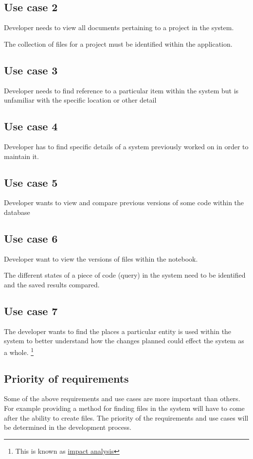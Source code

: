 \subsection{Use case 2}\label{use-case-2}

Developer needs to view all documents pertaining to a project in the
system.

The collection of files for a project must be identified within the application.

\subsection{Use case 3}\label{use-case-3}

Developer needs to find reference to a particular item within the system
but is unfamiliar with the specific location or other detail

\subsection{Use case 4}\label{use-case-4}

Developer has to find specific details of a system previously worked on
in order to maintain it.

\subsection{Use case 5}\label{use-case-5}

Developer wants to view and compare previous versions of some code
within the database

\subsection{Use case 6}\label{use-case-6}

Developer want to view the versions of files within the notebook.

The different states of a piece of code (query) in the system need to be identified and the saved results compared.

\subsection{Use case 7}\label{use-case-7}

The developer wants to find the places a particular entity is used
within the system to better understand how the changes planned could
effect the system as a whole. \footnote{%
  This is known as %
  \href{https://en.wikipedia.org/wiki/Change\_impact\_analysis}{impact
analysis}%
}

\subsection{Priority of requirements}

Some of the above requirements and use cases are more important than others. For example providing a method for finding files in the system will have to come after the ability to create files.
The priority of the requirements and use cases will be determined in the development process.
